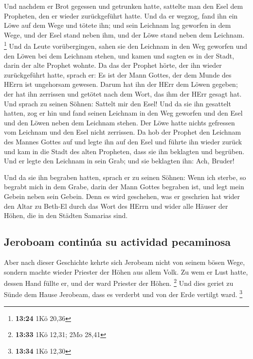  Und nachdem er Brot gegessen und getrunken hatte,
sattelte man den Esel dem Propheten, den er wieder zurückgeführt hatte.
 Und da er wegzog, fand ihn ein Löwe auf dem Wege und
tötete ihn; und sein Leichnam lag geworfen in dem Wege, und der Esel
stand neben ihm, und der Löwe stand neben dem Leichnam. \footnote{\textbf{13:24}
  1Kö 20,36}  Und da Leute vorübergingen, sahen sie den
Leichnam in den Weg geworfen und den Löwen bei dem Leichnam stehen, und
kamen und sagten es in der Stadt, darin der alte Prophet wohnte.
 Da das der Prophet hörte, der ihn wieder zurückgeführt
hatte, sprach er: Es ist der Mann Gottes, der dem Munde des HErrn ist
ungehorsam gewesen. Darum hat ihn der HErr dem Löwen gegeben; der hat
ihn zerrissen und getötet nach dem Wort, das ihm der HErr gesagt hat.
 Und sprach zu seinen Söhnen: Sattelt mir den Esel! Und
da sie ihn gesattelt hatten,  zog er hin und fand seinen
Leichnam in den Weg geworfen und den Esel und den Löwen neben dem
Leichnam stehen. Der Löwe hatte nichts gefressen vom Leichnam und den
Esel nicht zerrissen.  Da hob der Prophet den Leichnam
des Mannes Gottes auf und legte ihn auf den Esel und führte ihn wieder
zurück und kam in die Stadt des alten Propheten, dass sie ihn beklagten
und begrüben.  Und er legte den Leichnam in sein Grab;
und sie beklagten ihn: Ach, Bruder!

 Und da sie ihn begraben hatten, sprach er zu seinen
Söhnen: Wenn ich sterbe, so begrabt mich in dem Grabe, darin der Mann
Gottes begraben ist, und legt mein Gebein neben sein Gebein.
 Denn es wird geschehen, was er geschrien hat wider den
Altar zu Beth-El durch das Wort des HErrn und wider alle Häuser der
Höhen, die in den Städten Samarias sind.

\hypertarget{jeroboam-continuxfaa-su-actividad-pecaminosa}{%
\subsection{Jeroboam continúa su actividad
pecaminosa}\label{jeroboam-continuxfaa-su-actividad-pecaminosa}}

 Aber nach dieser Geschichte kehrte sich Jerobeam nicht
von seinem bösen Wege, sondern machte wieder Priester der Höhen aus
allem Volk. Zu wem er Lust hatte, dessen Hand füllte er, und der ward
Priester der Höhen. \footnote{\textbf{13:33} 1Kö 12,31; 2Mo 28,41}
 Und dies geriet zu Sünde dem Hause Jerobeam, dass es
verderbt und von der Erde vertilgt ward. \footnote{\textbf{13:34} 1Kö
  12,30}

